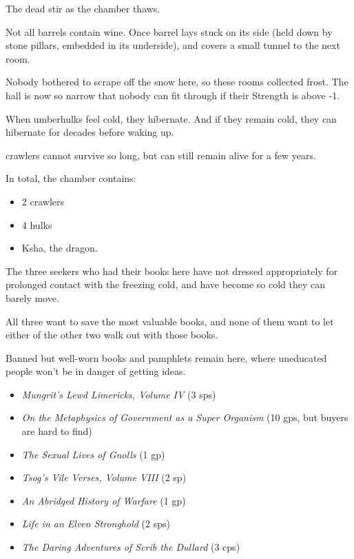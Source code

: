 \begin{multicols}{2}
The dead stir as the chamber thaws. 


Not all barrels contain wine.
Once barrel lays stuck on its side (held down by stone pillars, embedded in its underside), and covers a small tunnel to the next room.


Nobody bothered to scrape off the snow here, so these rooms collected frost.
The hall is now so narrow that nobody can fit through if their Strength is above -1.


When umberhulks feel cold, they hibernate.
And if they remain cold, they can hibernate for decades before waking up.

\Glspl{crawler} cannot survive so long, but can still remain alive for a few years.

In total, the chamber contains:

\begin{itemize}
  \item
  2 \glspl{crawler}
  \item
  4 \glspl{hulk}
  \item
  Ksha, the dragon.
\end{itemize}


The three \glspl{seeker} who had their books here have not dressed appropriately for prolonged contact with the freezing cold, and have become so cold they can barely move.

All three want to save the most valuable books, and none of them want to let either of the other two walk out with those books.


Banned but well-worn books and pamphlets remain here, where uneducated people won't be in danger of getting ideas.

\begin{itemize}
  \item
  \textit{Mungrit's Lewd Limericks, Volume IV} (3 \glspl{sp})
  \item
  \textit{On the Metaphysics of Government as a Super Organism} (10 \glspl{gp}, but buyers are hard to find)
  \item
  \textit{The Sexual Lives of Gnolls} (1 \gls{gp})
  \item
  \textit{Tsog's Vile Verses, Volume VIII} (2 sp)
  \item
  \textit{An Abridged History of Warfare} (1 \gls{gp})
  \item
  \textit{Life in an Elven Stronghold} (2 \glspl{sp})
  \item
  \textit{The Daring Adventures of Scrib the Dullard} (3 \glspl{cp})
\end{itemize}

\end{multicols}
